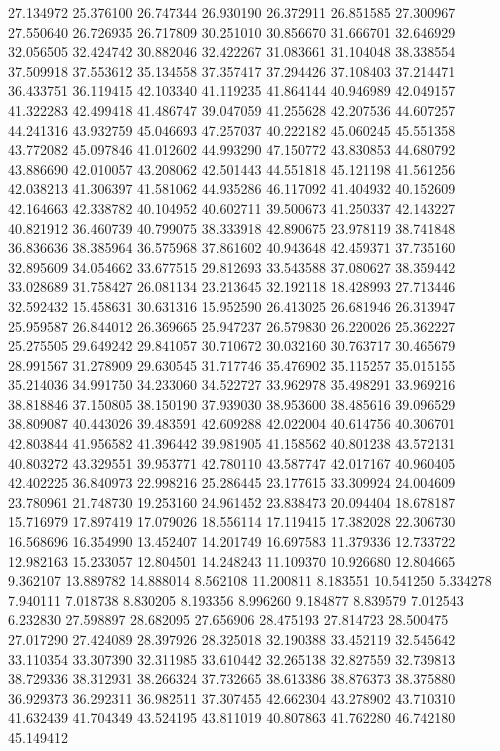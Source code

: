 27.134972
25.376100
26.747344
26.930190
26.372911
26.851585
27.300967
27.550640
26.726935
26.717809
30.251010
30.856670
31.666701
32.646929
32.056505
32.424742
30.882046
32.422267
31.083661
31.104048
38.338554
37.509918
37.553612
35.134558
37.357417
37.294426
37.108403
37.214471
36.433751
36.119415
42.103340
41.119235
41.864144
40.946989
42.049157
41.322283
42.499418
41.486747
39.047059
41.255628
42.207536
44.607257
44.241316
43.932759
45.046693
47.257037
40.222182
45.060245
45.551358
43.772082
45.097846
41.012602
44.993290
47.150772
43.830853
44.680792
43.886690
42.010057
43.208062
42.501443
44.551818
45.121198
41.561256
42.038213
41.306397
41.581062
44.935286
46.117092
41.404932
40.152609
42.164663
42.338782
40.104952
40.602711
39.500673
41.250337
42.143227
40.821912
36.460739
40.799075
38.333918
42.890675
23.978119
38.741848
36.836636
38.385964
36.575968
37.861602
40.943648
42.459371
37.735160
32.895609
34.054662
33.677515
29.812693
33.543588
37.080627
38.359442
33.028689
31.758427
26.081134
23.213645
32.192118
18.428993
27.713446
32.592432
15.458631
30.631316
15.952590
26.413025
26.681946
26.313947
25.959587
26.844012
26.369665
25.947237
26.579830
26.220026
25.362227
25.275505
29.649242
29.841057
30.710672
30.032160
30.763717
30.465679
28.991567
31.278909
29.630545
31.717746
35.476902
35.115257
35.015155
35.214036
34.991750
34.233060
34.522727
33.962978
35.498291
33.969216
38.818846
37.150805
38.150190
37.939030
38.953600
38.485616
39.096529
38.809087
40.443026
39.483591
42.609288
42.022004
40.614756
40.306701
42.803844
41.956582
41.396442
39.981905
41.158562
40.801238
43.572131
40.803272
43.329551
39.953771
42.780110
43.587747
42.017167
40.960405
42.402225
36.840973
22.998216
25.286445
23.177615
33.309924
24.004609
23.780961
21.748730
19.253160
24.961452
23.838473
20.094404
18.678187
15.716979
17.897419
17.079026
18.556114
17.119415
17.382028
22.306730
16.568696
16.354990
13.452407
14.201749
16.697583
11.379336
12.733722
12.982163
15.233057
12.804501
14.248243
11.109370
10.926680
12.804665
9.362107
13.889782
14.888014
8.562108
11.200811
8.183551
10.541250
5.334278
7.940111
7.018738
8.830205
8.193356
8.996260
9.184877
8.839579
7.012543
6.232830
27.598897
28.682095
27.656906
28.475193
27.814723
28.500475
27.017290
27.424089
28.397926
28.325018
32.190388
33.452119
32.545642
33.110354
33.307390
32.311985
33.610442
32.265138
32.827559
32.739813
38.729336
38.312931
38.266324
37.732665
38.613386
38.876373
38.375880
36.929373
36.292311
36.982511
37.307455
42.662304
43.278902
43.710310
41.632439
41.704349
43.524195
43.811019
40.807863
41.762280
46.742180
45.149412
